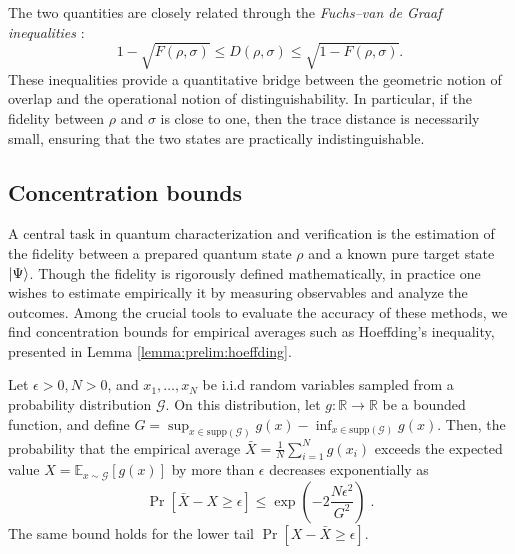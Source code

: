 \documentclass[a4paper,twocolumn,11pt,unpublished]{quantumarticle}
\newcommand{\dist}{\mathcal G} %
\begin{document}
The two quantities are closely related through the \emph{Fuchs--van de Graaf inequalities} \cite{FG97cryptographic}:
\begin{equation}
\label{eq:prelim:fuchsvandegraaf}
1 - \sqrt{F(\rho, \sigma)} \leq D(\rho, \sigma) \leq \sqrt{1 - F(\rho, \sigma)}.
\end{equation}
These inequalities provide a quantitative bridge between the geometric notion of overlap and the operational notion of distinguishability. In particular, if the fidelity between $\rho$ and $\sigma$ is close to one, then the trace distance is necessarily small, ensuring that the two states are practically indistinguishable. 

\subsection{Concentration bounds}
\label{subsection:prelim:concentration}
A central task in quantum characterization and verification is the estimation of the fidelity between a prepared quantum state $\rho$ and a known pure target state $\ket{\Psi}$. Though the fidelity is rigorously defined mathematically, in practice one wishes to estimate empirically it by measuring observables and analyze the outcomes. Among the crucial tools to evaluate the accuracy of these methods, we find concentration bounds for empirical averages such as Hoeffding's inequality, presented in Lemma \ref{lemma:prelim:hoeffding}.
\begin{lemma}
\label{lemma:prelim:hoeffding}
    Let $\epsilon>0, N>0$, and
    $x_1, \ldots, x_N$ be i.i.d random variables sampled from a probability distribution $\dist$. On this distribution, let $g:\mathbb R \rightarrow \mathbb R$ be a bounded function, and define $G = \sup_{x\in\mathrm{supp}(\dist)}g(x)-\inf_{x\in\mathrm{supp}(\dist)}g(x)$. Then, the probability that the empirical average $\bar X = \frac 1 N \sum_{i=1}^N g(x_{i})$ exceeds the expected value $X=\mathbb E_{x\sim\dist}[g(x)]$ by more than $\epsilon$ decreases exponentially as
    \begin{equation}
        \Pr\left[
        \bar X
        -
        X
        \geq \epsilon
        \right]
        \leq
        \exp{
        \left(
        -2\dfrac{N\epsilon^2}{G^2}
        \right)
        }\; .
    \end{equation}
    The same bound holds for the lower tail $\Pr[X - \bar X \geq \epsilon]$.
\end{lemma}
\end{document}
